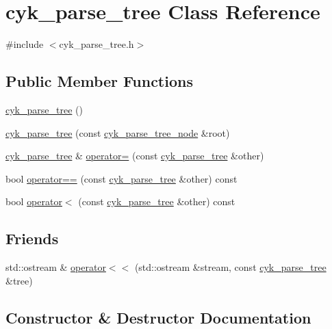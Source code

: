 \hypertarget{classcyk__parse__tree}{}\section{cyk\+\_\+parse\+\_\+tree Class Reference}
\label{classcyk__parse__tree}


{\ttfamily \#include $<$cyk\+\_\+parse\+\_\+tree.\+h$>$}

\subsection*{Public Member Functions}
\begin{DoxyCompactItemize}
\item 
\mbox{\hyperlink{classcyk__parse__tree_aba01f7ea56fb07b2fae3e5d879c40ada}{cyk\+\_\+parse\+\_\+tree}} ()
\item 
\mbox{\hyperlink{classcyk__parse__tree_a1a48d0b179ecf9bf9e438a4985c65143}{cyk\+\_\+parse\+\_\+tree}} (const \mbox{\hyperlink{classcyk__parse__tree__node}{cyk\+\_\+parse\+\_\+tree\+\_\+node}} \&root)
\item 
\mbox{\hyperlink{classcyk__parse__tree}{cyk\+\_\+parse\+\_\+tree}} \& \mbox{\hyperlink{classcyk__parse__tree_adfb07100edf8a49486996cad7d75c9ba}{operator=}} (const \mbox{\hyperlink{classcyk__parse__tree}{cyk\+\_\+parse\+\_\+tree}} \&other)
\item 
bool \mbox{\hyperlink{classcyk__parse__tree_a4e8f3ee73ba798d2cf73db68bb12492c}{operator==}} (const \mbox{\hyperlink{classcyk__parse__tree}{cyk\+\_\+parse\+\_\+tree}} \&other) const
\item 
bool \mbox{\hyperlink{classcyk__parse__tree_a886b5d6cd5f1e501fb9201f8bf00cd88}{operator$<$}} (const \mbox{\hyperlink{classcyk__parse__tree}{cyk\+\_\+parse\+\_\+tree}} \&other) const
\end{DoxyCompactItemize}
\subsection*{Friends}
\begin{DoxyCompactItemize}
\item 
std\+::ostream \& \mbox{\hyperlink{classcyk__parse__tree_ae088cc1ec70e4eb9c66a5fb12a81a5b8}{operator$<$$<$}} (std\+::ostream \&stream, const \mbox{\hyperlink{classcyk__parse__tree}{cyk\+\_\+parse\+\_\+tree}} \&tree)
\end{DoxyCompactItemize}


\subsection{Constructor \& Destructor Documentation}
\mbox{\label{classcyk__parse__tree_aba01f7ea56fb07b2fae3e5d879c40ada}} 
